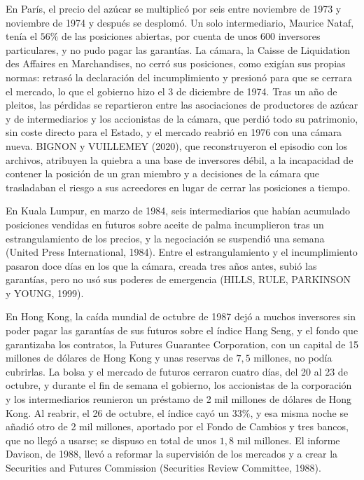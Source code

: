 \documentclass[10pt,a4paper]{article}
\begin{document}
En París, el precio del azúcar se multiplicó por seis entre noviembre de 1973 y noviembre de 1974 y después se desplomó. Un solo intermediario, Maurice Nataf, tenía el $56\%$ de las posiciones abiertas, por cuenta de unos 600 inversores particulares, y no pudo pagar las garantías. La cámara, la Caisse de Liquidation des Affaires en Marchandises, no cerró sus posiciones, como exigían sus propias normas: retrasó la declaración del incumplimiento y presionó para que se cerrara el mercado, lo que el gobierno hizo el 3 de diciembre de 1974. Tras un año de pleitos, las pérdidas se repartieron entre las asociaciones de productores de azúcar y de intermediarios y los accionistas de la cámara, que perdió todo su patrimonio, sin coste directo para el Estado, y el mercado reabrió en 1976 con una cámara nueva. BIGNON y VUILLEMEY (2020), que reconstruyeron el episodio con los archivos, atribuyen la quiebra a una base de inversores débil, a la incapacidad de contener la posición de un gran miembro y a decisiones de la cámara que trasladaban el riesgo a sus acreedores en lugar de cerrar las posiciones a tiempo.

En Kuala Lumpur, en marzo de 1984, seis intermediarios que habían acumulado posiciones vendidas en futuros sobre aceite de palma incumplieron tras un estrangulamiento de los precios, y la negociación se suspendió una semana (United Press International, 1984). Entre el estrangulamiento y el incumplimiento pasaron doce días en los que la cámara, creada tres años antes, subió las garantías, pero no usó sus poderes de emergencia (HILLS, RULE, PARKINSON y YOUNG, 1999).

En Hong Kong, la caída mundial de octubre de 1987 dejó a muchos inversores sin poder pagar las garantías de sus futuros sobre el índice Hang Seng, y el fondo que garantizaba los contratos, la Futures Guarantee Corporation, con un capital de 15 millones de dólares de Hong Kong y unas reservas de $7{,}5$ millones, no podía cubrirlas. La bolsa y el mercado de futuros cerraron cuatro días, del 20 al 23 de octubre, y durante el fin de semana el gobierno, los accionistas de la corporación y los intermediarios reunieron un préstamo de 2 mil millones de dólares de Hong Kong. Al reabrir, el 26 de octubre, el índice cayó un $33\%$, y esa misma noche se añadió otro de 2 mil millones, aportado por el Fondo de Cambios y tres bancos, que no llegó a usarse; se dispuso en total de unos $1{,}8$ mil millones. El informe Davison, de 1988, llevó a reformar la supervisión de los mercados y a crear la Securities and Futures Commission (Securities Review Committee, 1988).
\end{document}
